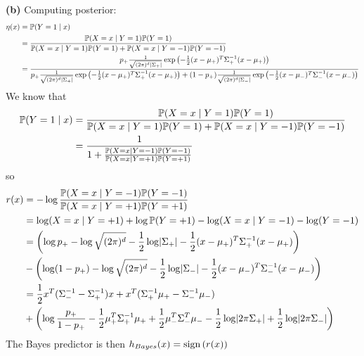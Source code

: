 \documentclass[a4paper, 11pt]{article}
\begin{document}
\begin{problem}
\textbf{(b)} Computing posterior:
\begin{align*}
    \eta(x) &= \mathbb{P}(Y = 1 \mid x) \\
    &= \frac{\mathbb{P}(X = x \mid Y = 1) \mathbb{P}(Y = 1)}{\mathbb{P}(X = x \mid Y = 1) \mathbb{P}(Y=1) + \mathbb{P}(X = x \mid Y = -1) \mathbb{P}(Y = -1)} \\
    &= \frac{p_+ \frac{1}{\sqrt{(2\pi)^d \lvert\Sigma_+\rvert}}\exp\left({-\frac{1}{2} (x - \mu_+)^T \Sigma_+^{-1} (x - \mu_+)}\right)}{p_+ \frac{1}{\sqrt{(2\pi)^d \lvert\Sigma_+\rvert}}\exp\left({-\frac{1}{2} (x - \mu_+)^T \Sigma_+^{-1} (x - \mu_+)}\right) + (1 - p_+) \frac{1}{\sqrt{(2\pi)^d \lvert\Sigma_-\rvert}}\exp\left({-\frac{1}{2} (x - \mu_-)^T \Sigma_-^{-1} (x - \mu_-)}\right)}
\end{align*}
We know that \begin{align*}
    \mathbb{P}(Y = 1 \mid x) &= \frac{\mathbb{P}(X = x \mid Y = 1) \mathbb{P}(Y = 1)}{\mathbb{P}(X = x \mid Y = 1) \mathbb{P}(Y=1) + \mathbb{P}(X = x \mid Y = -1) \mathbb{P}(Y = -1)}\\
    &= \frac{1}{1 + \frac{\mathbb{P}(X = x\mid Y=-1) \mathbb{P}(Y = -1)}{\mathbb{P}(X = x \mid Y = +1)\mathbb{P}(Y = +1)}}
\end{align*}
so \begin{align*}
    r(x) &= -\log \frac{\mathbb{P}(X = x\mid Y=-1) \mathbb{P}(Y = -1)}{\mathbb{P}(X = x \mid Y = +1)\mathbb{P}(Y = +1)} \\
    &= \log(X = x \mid Y = +1) + \log \mathbb{P}(Y = +1)  - \log(X = x \mid Y = -1) - \log(Y = -1) \\
    &= \left(\log p_+ - \log \sqrt{(2\pi)^d} - \frac{1}{2} \log \lvert\Sigma_+\rvert - \frac{1}{2} (x - \mu_+)^T \Sigma^{-1}_+ (x - \mu_+) \right) \\
    &-\left(\log (1 - p_+) - \log \sqrt{(2\pi)^d} - \frac{1}{2} \log \lvert\Sigma_-\rvert - \frac{1}{2} (x - \mu_-)^T \Sigma^{-1}_- (x - \mu_-) \right) \\
    &= \frac{1}{2} x^T (\Sigma_-^{-1}- \Sigma_+^{-1})x + x^T(\Sigma_+^{-1}\mu_+ - \Sigma_-^{-1}\mu_-)\\ 
    &+ \left(\log \frac{p_+}{1 - p_+} - \frac{1}{2} \mu_+^T \Sigma_+^{-1} \mu_+ + \frac{1}{2} \mu_-^T \Sigma_-^T \mu_- - \frac{1}{2} \log \lvert2\pi\Sigma_+\rvert + \frac{1}{2} \log \lvert2\pi\Sigma_-\rvert\right)
\end{align*}
The Bayes predictor is then $h_{Bayes}(x) = \mathrm{sign}\left(r(x)\right)$


\end{problem}
\end{document}
